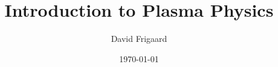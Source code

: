 \documentclass[iltitle]{../frigaardreportF}
\author{David Frigaard}
\title{Introduction to Plasma Physics}
\date{\today}
\begin{document}
\maketitle
\frontmatter
\lipsum
\mainmatter
\lipsum
\backmatter
\lipsum
\end{document}
